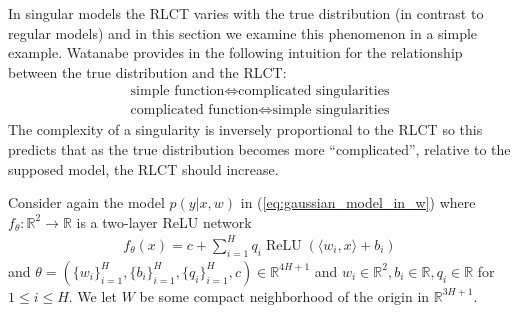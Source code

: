 \documentclass{article} %
\begin{document}
In singular models the RLCT varies with the true distribution (in contrast to regular models) and in this section we examine this phenomenon in a simple example. Watanabe provides in \citep[\S 7.6]{watanabe_algebraic_2009} the following intuition for the relationship between the true distribution and the RLCT:
\begin{align*}
\text{simple function} \iff \text{complicated singularities}\\
\text{complicated function} \iff \text{simple singularities}
\end{align*}
The complexity of a singularity is inversely proportional to the RLCT so this predicts that as the true distribution becomes more ``complicated'', relative to the supposed model, the RLCT should increase. %

Consider again the model $p(y|x,w)$ in (\ref{eq:gaussian_model_in_w}) where $f_\theta: \mathbb{R}^2 \longrightarrow \mathbb{R}$ is a two-layer ReLU network
\begin{gather*}
f_\theta(x) = c + \sum_{i=1}^H q_i \operatorname{ReLU}( \langle w_i, x \rangle + b_i )
\end{gather*}
and $\theta = (\{w_i\}_{i=1}^H, \{b_i\}_{i=1}^H, \{q_i\}_{i=1}^H, c) \in \mathbb{R}^{4H+1}$ and $w_i \in \mathbb{R}^2, b_i \in \mathbb{R}, q_i \in \mathbb{R}$ for $1 \le i \le H$. We let $W$ be some compact neighborhood of the origin in $\mathbb{R}^{3H+1}$.
\end{document}
